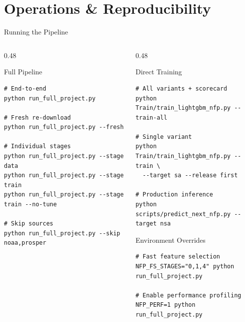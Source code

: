 \documentclass[aspectratio=169,10pt]{beamer}
\begin{document}
\section{Operations \& Reproducibility}

\begin{frame}[fragile]{Running the Pipeline}
\begin{columns}[T]
\begin{column}{0.48\textwidth}
\begin{block}{Full Pipeline}
\begin{lstlisting}[style=pseudo, morekeywords={python,bash}]
# End-to-end
python run_full_project.py

# Fresh re-download
python run_full_project.py --fresh

# Individual stages
python run_full_project.py --stage data
python run_full_project.py --stage train
python run_full_project.py --stage train --no-tune

# Skip sources
python run_full_project.py --skip noaa,prosper
\end{lstlisting}
\end{block}
\end{column}
\begin{column}{0.48\textwidth}
\begin{block}{Direct Training}
\begin{lstlisting}[style=pseudo, morekeywords={python}]
# All variants + scorecard
python Train/train_lightgbm_nfp.py --train-all

# Single variant
python Train/train_lightgbm_nfp.py --train \
  --target sa --release first

# Production inference
python scripts/predict_next_nfp.py --target nsa
\end{lstlisting}
\end{block}

\begin{block}{Environment Overrides}
\begin{lstlisting}[style=pseudo]
# Fast feature selection
NFP_FS_STAGES="0,1,4" python run_full_project.py

# Enable performance profiling
NFP_PERF=1 python run_full_project.py
\end{lstlisting}
\end{block}
\end{column}
\end{columns}
\end{frame}
\end{document}
